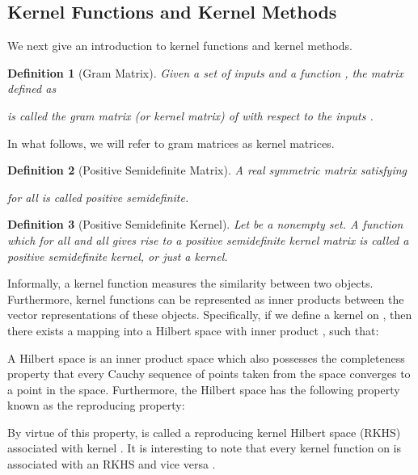 \documentclass[twoside,11pt]{article}
\newtheorem{definition}{Definition}
\begin{document}
\subsection{Kernel Functions and Kernel Methods}
We next give an introduction to kernel functions and kernel methods.
\begin{definition}[Gram Matrix]
  Given a set of inputs  and a function , the  matrix  defined as
  
  is called the gram matrix (or kernel matrix) of  with respect to the inputs .
\end{definition} 
In what follows, we will refer to gram matrices as kernel matrices.
\begin{definition}[Positive Semidefinite Matrix]
  A real  symmetric matrix  satisfying
  
  for all  is called positive semidefinite.
\end{definition}
\begin{definition}[Positive Semidefinite Kernel]
  Let  be a nonempty set.
  A function  which for all  and all  gives rise to a positive semidefinite kernel matrix is called a positive semidefinite kernel, or just a kernel.
\end{definition} 
Informally, a kernel function 
measures the similarity between two objects. 
Furthermore, kernel functions can be represented as inner products between the vector representations of these objects. 
Specifically, if we define a kernel  on , then there exists a mapping  into a Hilbert space with inner product , such that:

A Hilbert space is an inner product space which also possesses the completeness property that every Cauchy sequence of points taken from the space converges to a point in the space.
Furthermore, the Hilbert space  has the following property known as the reproducing property:

By virtue of this property,  is called a reproducing kernel Hilbert space (RKHS) associated with kernel .
It is interesting to note that every kernel function on  is associated with an RKHS and vice versa .
\end{document}
